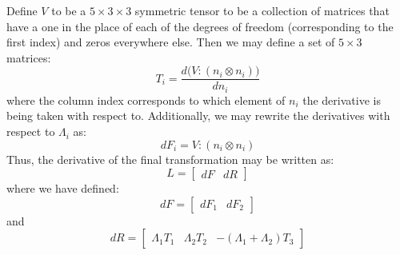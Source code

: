 \documentclass[reqno]{article}
\begin{document}
  Define $V$ to be a $5 \times 3 \times 3$ symmetric tensor to be a collection
  of matrices that have a one in the place of each of the degrees of freedom
  (corresponding to the first index) and zeros everywhere else.
  Then we may define a set of $5 \times 3$ matrices:
  \begin{equation}
    T_i
    =
    \frac{d \bigl( V : (n_i \otimes n_i)\bigr)}{d n_i}
  \end{equation}
  where the column index corresponds to which element of $n_i$ the derivative is
  being taken with respect to.
  Additionally, we may rewrite the derivatives with respect to $\Lambda_i$ as:
  \begin{equation}
    dF_i
    =
    V : (n_i \otimes n_i)
  \end{equation}
  Thus, the derivative of the final transformation may be written as:
  \begin{equation}
    L
    =
    \begin{bmatrix}
      d F & dR 
    \end{bmatrix}
  \end{equation}
  where we have defined:
  \begin{equation}
    d F
    =
    \begin{bmatrix}
      d F_1 & dF_2
    \end{bmatrix}
  \end{equation}
  and
  \begin{equation}
    dR
    =
    \begin{bmatrix}
      \Lambda_1 T_1 & \Lambda_2 T_2 & -(\Lambda_1 + \Lambda_2)T_3
    \end{bmatrix}
  \end{equation}
\end{document}
